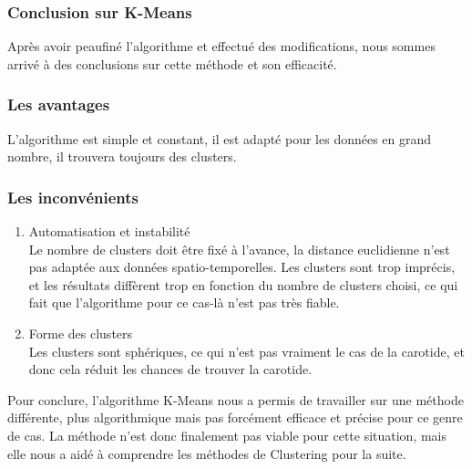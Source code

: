\documentclass[a4paper]{article}
\begin{document}
            
            \subsubsection*{Conclusion sur K-Means}
            Après avoir peaufiné l'algorithme et effectué des modifications, nous sommes arrivé à des conclusions sur cette méthode et son efficacité.
            
            \subsubsection*{Les avantages}
            L'algorithme est simple et constant, il est adapté pour les données en grand nombre, il trouvera toujours des clusters.
            
            \subsubsection*{Les inconvénients}
            \begin{enumerate}
                \item Automatisation et instabilité\\
                Le nombre de clusters doit être fixé à l'avance, la distance euclidienne n'est pas adaptée aux données spatio-temporelles. Les clusters sont trop imprécis, et les résultats diffèrent trop en fonction du nombre de clusters choisi, ce qui fait que l'algorithme pour ce cas-là n'est pas très fiable.\\
                \item Forme des clusters\\
                Les clusters sont sphériques, ce qui n'est pas vraiment le cas de la carotide, et donc cela réduit les chances de trouver la carotide.\\
            \end{enumerate}
         
            Pour conclure, l'algorithme K-Means nous a permis de travailler sur une méthode différente, plus algorithmique mais pas forcément efficace et précise pour ce genre de cas. La méthode n'est donc finalement pas viable pour cette situation, mais elle nous a aidé à comprendre les méthodes de Clustering pour la suite.
            
    \hspace{1cm}   
    \newpage

\end{document}
